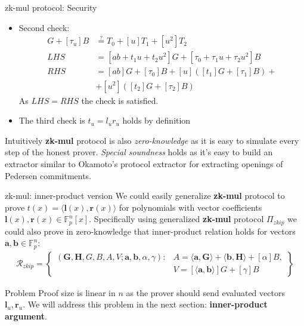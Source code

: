 \documentclass{zkdl-presentation-template}
\begin{document}
    \begin{frame}{zk-mul protocol: Security}
        \begin{itemize}
            \item Second check: \begin{align*}
                [t_u]G + [\tau_u]B &\stackrel{?}{=} T_0 + [u]T_1 + [u^2]T_2 \\
                LHS &= [ab + t_1 u + t_2 u^2]G + [\tau_0 + \tau_1 u + \tau_2 u^2]B\\
                RHS &=[ab]G + [\tau_0]B + [u]([t_1]G + [\tau_1]B) + \\
                &+ [u^2]([t_2]G + [\tau_2]B)
            \end{align*}
            As $LHS = RHS$ the check is satisfied.\pause
            \item The third check is $t_u = l_u r_u$ holds by definition
        \end{itemize}
        \pause
        Intuitively \textbf{zk-mul} protocol is also \textit{zero-knowledge} as it is easy to simulate every step of the honest prover. \textit{Special soundness} holds as it's easy to build an extractor similar to Okamoto's protocol extractor for extracting openings of Pedersen commitments.
    \end{frame}

    \begin{frame}{zk-mul: inner-product version}
        We could easily generalize \textbf{zk-mul} protocol to prove $t(x) = \langle \mathbf{l}(x), \mathbf{r}(x) \rangle $ for polynomials with vector coefficients $\mathbf{l}(x), \mathbf{r}(x) \in \mathbb{F}_p^n[x]$. \pause Specifically using generalized \textbf{zk-mul} protocol $\Pi_{zkip}$ we could also prove in zero-knowledge that inner-product relation holds for vectors $\mathbf{a}, \mathbf{b} \in \mathbb{F}_p^n$:
        \begin{align*}
            \mathcal{R}_{zkip} = \left\{ \begin{aligned} (\mathbf{G,H},G,B,A,V;\mathbf{a,b},\alpha, \gamma) : & A = \langle \mathbf{a,G} \rangle + \langle \mathbf{b,H} \rangle + [\alpha] B, \\ & V = [\langle \mathbf{a,b} \rangle]G + [\gamma]B \end{aligned} \right\}
        \end{align*}
        \pause
        \begin{alertblock}{Problem}
            Proof size is linear in $n$ as the prover should send evaluated vectors $\mathbf{l}_u, \mathbf{r}_u$. We will address this problem in the next section: \textbf{inner-product argument}.
        \end{alertblock}
    \end{frame}
\end{document}
